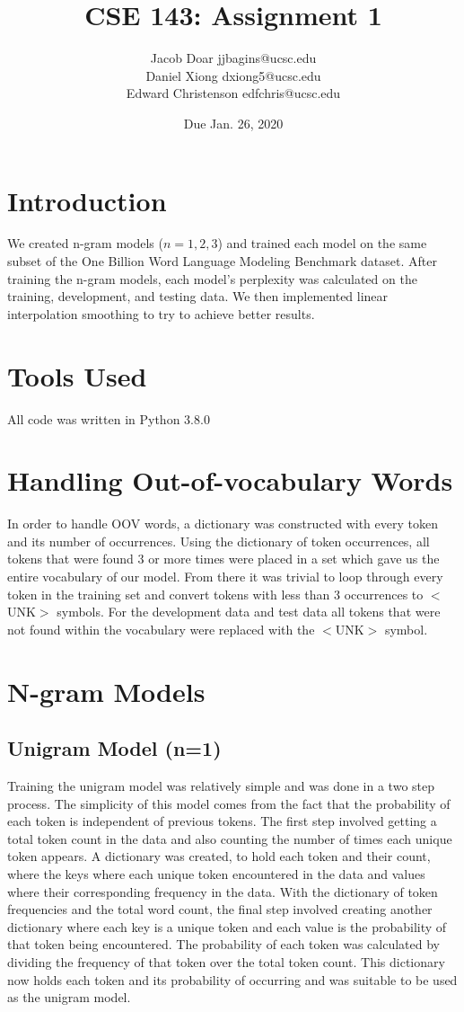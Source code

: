\documentclass[12pt,notitlepage]{article}
\title{CSE 143: Assignment 1}
\author{Jacob Doar jjbagins@ucsc.edu\\
	Daniel Xiong dxiong5@ucsc.edu\\
	Edward Christenson edfchris@ucsc.edu}
\date{Due Jan. 26, 2020}
\begin{document}
\maketitle

\section{Introduction}
\tab We created n-gram models ($n=1,2,3$) and trained each model on the same subset of the One Billion Word Language Modeling Benchmark dataset. After training the n-gram models, each model's perplexity was calculated on the training, development, and testing data. We then implemented linear interpolation smoothing to try to achieve better results.

\section{Tools Used}
\tab All code was written in Python 3.8.0

\section{Handling Out-of-vocabulary Words}
\tab In order to handle OOV words, a dictionary was constructed with every token and its number of occurrences. Using the dictionary of token occurrences, all tokens that were found 3 or more times were placed in a set which gave us the entire vocabulary of our model. From there it was trivial to loop through every token in the training set and convert tokens with less than 3 occurrences to $<$UNK$>$ symbols. For the development data and test data all tokens that were not found within the vocabulary were replaced with the $<$UNK$>$ symbol. 

\section{N-gram Models}

\subsection{Unigram Model (n=1)}
\tab Training the unigram model was relatively simple and was done in a two step process. The simplicity of this model comes from the fact that the probability of each token is independent of previous tokens. The first step involved getting a total token count in the data and also counting the number of times each unique token appears. A dictionary was created, to hold each token and their count, where the keys where each unique token encountered in the data and values where their corresponding frequency in the data. With the dictionary of token frequencies and the total word count, the final step involved creating another dictionary where each key is a unique token and each value is the probability of that token being encountered. The probability of each token was calculated by dividing the frequency of that token over the total token count. This dictionary now holds each token and its probability of occurring and was suitable to be used as the unigram model.
\end{document}
